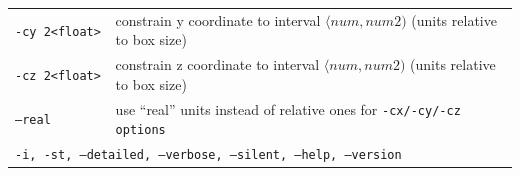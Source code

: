 \begin{longtable}{p{}p{}}
  \tt{-cy 2<float>}        & constrain y coordinate to interval
                             $\langle num, num2)$ (units relative to box size)\\
  \tt{-cz 2<float>}        & constrain z coordinate to interval
                             $\langle num, num2)$ (units relative to box size)\\
  \tt{--real}              & use \enquote{real} units instead of relative ones
                             for \tt{-cx}/\tt{-cy}/\tt{-cz} options\\
  \midrule
  \multicolumn{2}{p{0.948\textwidth}}{\tt{-i},
                                      \tt{-st},
                                      \tt{--detailed},
                                      \tt{--verbose},
                                      \tt{--silent},
                                      \tt{--help},
                                      \tt{--version}}\\
  \bottomrule
\end{longtable}
